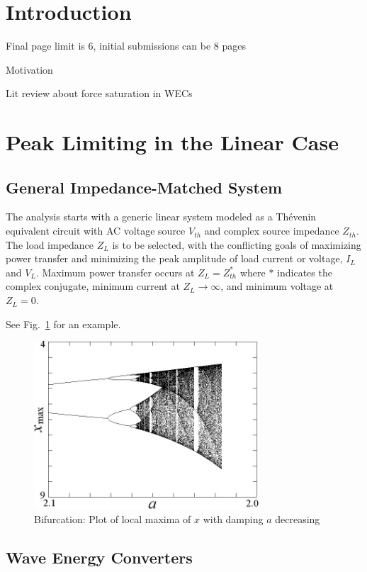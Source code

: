 \documentclass{ifacconf}
\begin{document}
\section{Introduction}
Final page limit is 6, initial submissions can be 8 pages

Motivation

Lit review about force saturation in WECs

\section{Peak Limiting in the Linear Case}
\subsection{General Impedance-Matched System}
The analysis starts with a generic linear system modeled as a Thévenin equivalent circuit with AC voltage source $V_{th}$ and complex source impedance $Z_{th}$. The load impedance $Z_L$ is to be selected, with the conflicting goals of maximizing power transfer and minimizing the peak amplitude of load current or voltage, $I_L$ and $V_L$. Maximum power transfer occurs at $Z_L = Z_{th}^*$ where $*$ indicates the complex conjugate, minimum current at $Z_L \rightarrow \infty$, and minimum voltage at $Z_L = 0$.

See  Fig.~\ref{fig:circuit} for an example.

\begin{figure}
\begin{center}
\includegraphics[width=8.4cm]{bifurcation}    %
\caption{Bifurcation: Plot of local maxima of $x$ with damping $a$ decreasing} 
\label{fig:circuit}
\end{center}
\end{figure}

\subsection{Wave Energy Converters}
\end{document}
